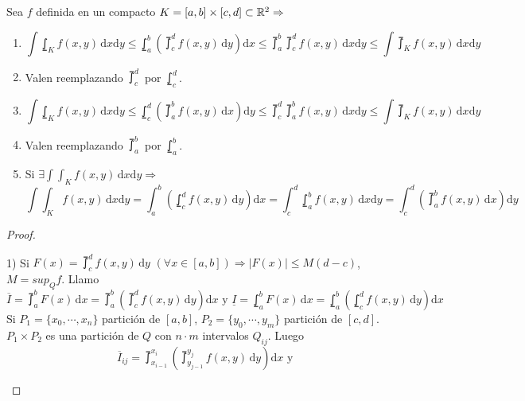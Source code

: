 \begin{theorem}
  Sea $f$ definida en un compacto $K = [a, b] \times [c, d] \subset \mathbb{R}^2 \Rightarrow$ \begin{enumerate}
    \item \begin{equation}
      \int \lowint_K f(x, y) \, \mathrm{d}x \mathrm{d}y \leq \lowint_a^b(\upint_c^d f(x, y)\, \mathrm{d}y)\mathrm{d}x \leq \upint_a^b \upint_c^d f(x, y) \, \mathrm{d}x \mathrm{d}y \leq \int \upint_K f(x, y) \, \mathrm{d}x \mathrm{d}y
    \end{equation}
    \item Valen reemplazando $\upint_c^d$ por $\lowint_c^d$.
    \item \begin{equation}
      \int \lowint_K f(x, y) \, \mathrm{d}x \mathrm{d}y \leq \lowint_c^d ( \upint_a^b f(x, y)\, \mathrm{d}x ) \mathrm{d}y \leq \upint_c^d \upint_a^b f(x, y) \, \mathrm{d}x \mathrm{d}y \leq \int \upint_K f(x, y) \, \mathrm{d}x \mathrm{d}y
    \end{equation}
    \item Valen reemplazando $\upint_a^b$ por $\lowint_a^b$.
    \item Si $\exists \int \int_K f(x, y) \, \mathrm{d}x \mathrm{d}y \Rightarrow$ \begin{equation}
      \int \int_K f(x, y) \, \mathrm{d}x \mathrm{d}y = \int_a^b(\lowint_c^d f(x, y) \, \mathrm{d}y)\mathrm{d}x = \int_c^d \lowint_a^b f(x, y) \, \mathrm{d}x \mathrm{d}y = \int_c^d(\upint_a^b f(x,y) \, \mathrm{d}x)\mathrm{d}y
    \end{equation} 
  \end{enumerate}
  \begin{proof}
    \begin{enumerate}
      1) Si $F(x) = \upint_c^d f(x, y) \, \mathrm{d}y$ $(\forall x \in [a, b]) \Rightarrow |F(x)| \leq M (d - c)$, $M = sup_Q f$. Llamo \begin{equation}
        \overline{I} = \upint_a^b F(x)\, \mathrm{d}x = \upint_a^b(\upint_c^d f(x, y)\, \mathrm{d}y) \mathrm{d}x \text{ y }
        \underline{I} = \lowint_a^b F(x)\, \mathrm{d}x = \lowint_a^b( \lowint_c^d f(x, y)\, \mathrm{d}y) \mathrm{d}x
      \end{equation} Si $P_1 = \{x_0, \cdots, x_n\}$ partición de $[a, b]$, $P_2 = \{ y_0, \cdots, y_m \}$ partición de $[c, d]$. $P_1 \times P_2$ es una partición de $Q$ con $n \cdot m$ intervalos $Q_{ij}$. Luego \begin{equation}
        \overline{I}_{ij} = \upint_{x_{i-1}}^{x_i}( \upint_{y_{j-1}}^{y_j}f(x, y)\,\mathrm{d}y)\mathrm{d}x \text{ y }

\end{equation}
\end{enumerate}
\end{proof}
\end{theorem}
